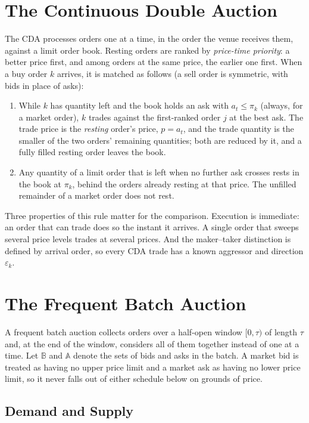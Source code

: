 \section{The Continuous Double Auction}
\label{sec:cdaformal}

The CDA processes orders one at a time, in the order the venue receives
them, against a limit order book. Resting orders are ranked by
\emph{price-time priority}: a better price first, and among orders at the
same price, the earlier one first. When a buy order $k$ arrives, it is
matched as follows (a sell order is symmetric, with bids in place of
asks):
\begin{enumerate}
  \item While $k$ has quantity left and the book holds an ask with
  $a_t \le \pi_k$ (always, for a market order), $k$ trades against the
  first-ranked order $j$ at the best ask. The trade price is the
  \emph{resting} order's price, $p = a_t$, and the trade quantity is the
  smaller of the two orders' remaining quantities; both are reduced by it,
  and a fully filled resting order leaves the book.
  \item Any quantity of a limit order that is left when no further ask
  crosses rests in the book at $\pi_k$, behind the orders already resting
  at that price. The unfilled remainder of a market order does not rest.
\end{enumerate}
Three properties of this rule matter for the comparison. Execution is
immediate: an order that can trade does so the instant it arrives. A
single order that sweeps several price levels trades at several prices.
And the maker--taker distinction is defined by arrival order, so every
CDA trade has a known aggressor and direction $\varepsilon_k$.

\section{The Frequent Batch Auction}
\label{sec:fbanotation}

A frequent batch auction collects orders over a half-open window $[0,\tau)$
of length $\tau$ and, at the end of the window, considers all of them
together instead of one at a time. Let $\mathbb{B}$ and $\mathbb{A}$
denote the sets of bids and asks in the batch. A market bid is treated as
having no upper price limit and a market ask as having no lower price
limit, so it never falls out of either schedule below on grounds of
price.

\subsection{Demand and Supply}

